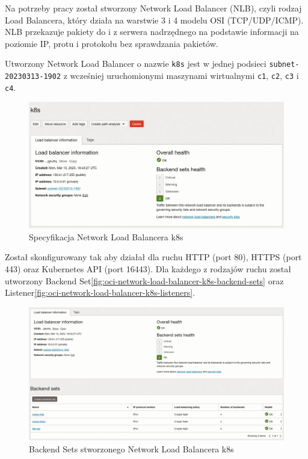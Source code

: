 Na potrzeby pracy został stworzony Network Load Balancer (NLB), czyli rodzaj Load Balancera, który działa na warstwie 3 i 4 modelu OSI (TCP/UDP/ICMP).
NLB przekazuje pakiety do i z serwera nadrzędnego na podstawie informacji na poziomie IP, protu i protokołu bez sprawdzania pakietów.

Utworzony Network Load Balancer o nazwie \texttt{k8s} jest w jednej podsieci \texttt{subnet-20230313-1902} z wcześniej uruchomionymi maszynami wirtualnymi \texttt{c1}, \texttt{c2}, \texttt{c3} i \texttt{c4}.

\begin{figure}[H]
    \centering
    \includegraphics[width=\textwidth]{img/oci-network-load-balancer-k8s}
    \caption{Specyfikacja Network Load Balancera k8s}
    \label{fig:oci-network-load-balancer-k8s}
\end{figure}

Został skonfigurowany tak aby działał dla ruchu HTTP (port 80), HTTPS (port 443) oraz Kubernetes API (port 16443).
Dla każdego z rodzajów ruchu został utworzony {Backend Set}\autoref{fig:oci-network-load-balancer-k8s-backend-sets} oraz {Listener}\autoref{fig:oci-network-load-balancer-k8s-listeners}.

\begin{figure}[H]
    \centering
    \includegraphics[width=\textwidth]{img/oci-network-load-balancer-k8s-backend-sets}
    \caption{Backend Sets stworzonego Network Load Balancera k8s}
    \label{fig:oci-network-load-balancer-k8s-backend-sets}
\end{figure}

